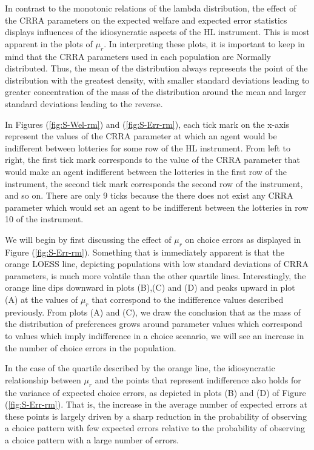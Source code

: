 \documentclass[11pt,a4paper]{article} %
\begin{document}
In contrast to the monotonic relations of the lambda distribution, the effect of the CRRA parameters on the expected welfare and expected error statistics displays influences of the idiosyncratic aspects of the HL instrument.
This is most apparent in the plots of $\mu_r$.
In interpreting these plots, it is important to keep in mind that the CRRA parameters used in each population are Normally distributed.
Thus, the mean of the distribution always represents the point of the distribution with the greatest density, with smaller standard deviations leading to greater concentration of the mass of the distribution around the mean and larger standard deviations leading to the reverse.

In Figures (\ref{fig:S-Wel-rm}) and (\ref{fig:S-Err-rm}), each tick mark on the x-axis represent the values of the CRRA parameter at which an agent would be indifferent between lotteries for some row of the HL instrument.
From left to right, the first tick mark corresponds to the value of the CRRA parameter that would make an agent indifferent between the lotteries in the first row of the instrument, the second tick mark corresponds the second row of the instrument, and so on.
There are only 9 ticks because the there does not exist any CRRA parameter which would set an agent to be indifferent between the lotteries in row 10 of the instrument.

We will begin by first discussing the effect of $\mu_r$ on choice errors as displayed in Figure (\ref{fig:S-Err-rm}).
Something that is immediately apparent is that the orange LOESS line, depicting populations with low standard deviations of CRRA parameters, is much more volatile than the other quartile lines.
Interestingly, the orange line dips downward in plots (B),(C) and (D) and peaks upward in plot (A) at the values of $\mu_r$ that correspond to the indifference values described previously.
From plots (A) and (C), we draw the conclusion that as the mass of the distribution of preferences grows around parameter values which correspond to values which imply indifference in a choice scenario, we will see an increase in the number of choice errors in the population.

In the case of the quartile described by the orange line, the idiosyncratic relationship between $\mu_r$ and the points that represent indifference also holds for the variance of expected choice errors, as depicted in plots (B) and (D) of Figure (\ref{fig:S-Err-rm}).
That is, the increase in the average number of expected errors at these points is largely driven by a sharp reduction in the probability of observing a choice pattern with few expected errors relative to the probability of observing a choice pattern with a large number of errors.{\footnotemark}
\end{document}
